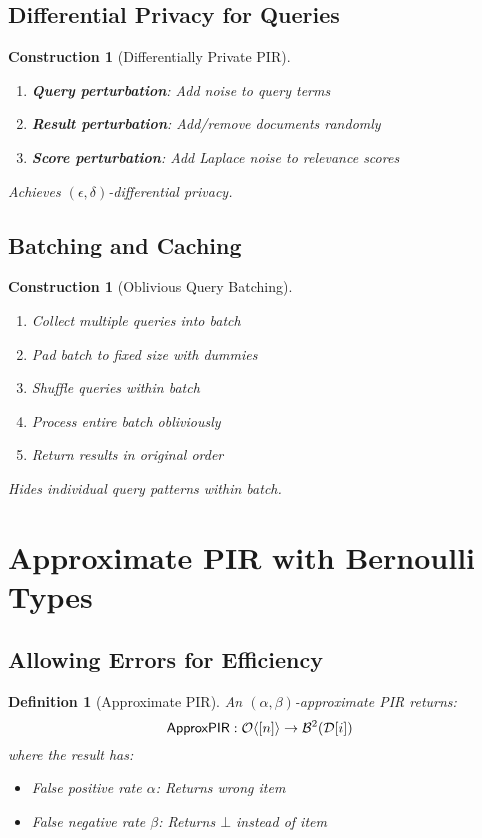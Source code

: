 \documentclass[11pt,final]{article}
\newcommand{\DB}{\mathcal{D}}
\newcommand{\Index}[1]{[#1]}
\newtheorem{definition}[theorem]{Definition}
\newtheorem{construction}[theorem]{Construction}
\begin{document}
\subsection{Differential Privacy for Queries}

\begin{construction}[Differentially Private PIR]
\begin{enumerate}
    \item \textbf{Query perturbation}: Add noise to query terms
    \item \textbf{Result perturbation}: Add/remove documents randomly
    \item \textbf{Score perturbation}: Add Laplace noise to relevance scores
\end{enumerate}
Achieves $(\epsilon, \delta)$-differential privacy.
\end{construction}

\subsection{Batching and Caching}

\begin{construction}[Oblivious Query Batching]
\begin{enumerate}
    \item Collect multiple queries into batch
    \item Pad batch to fixed size with dummies
    \item Shuffle queries within batch
    \item Process entire batch obliviously
    \item Return results in original order
\end{enumerate}
Hides individual query patterns within batch.
\end{construction}

\section{Approximate PIR with Bernoulli Types}

\subsection{Allowing Errors for Efficiency}

\begin{definition}[Approximate PIR]
An $(\alpha, \beta)$-approximate PIR returns:
\begin{equation}
\mathsf{ApproxPIR}: \Obv{\Index{n}} \to \Bernoulli{\DB[i]}{2}
\end{equation}
where the result has:
\begin{itemize}
    \item False positive rate $\alpha$: Returns wrong item
    \item False negative rate $\beta$: Returns $\bot$ instead of item
\end{itemize}
\end{definition}
\end{document}
